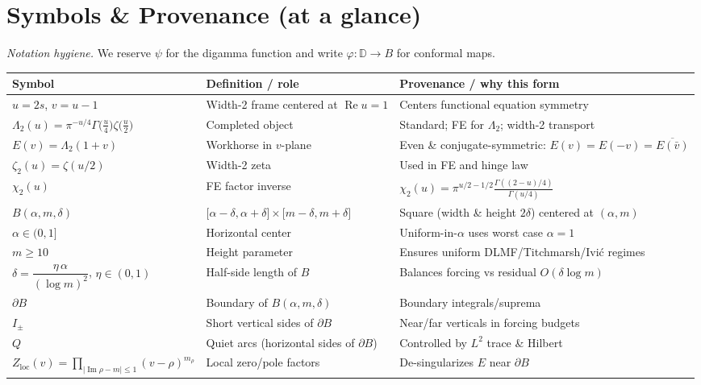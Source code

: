 \documentclass[11pt]{article}
\numberwithin{equation}{section}
\theoremstyle{remark}
\newcommand{\D}{\mathbb{D}}
\DeclareMathOperator{\Imag}{Im}
\DeclareMathOperator{\Real}{Re}
\newcommand{\LamTwo}{\Lambda_2}
\newcommand{\chiTwo}{\chi_2}
\newcommand{\Zloc}{Z_{\mathrm{loc}}}
\begin{document}
\section*{Symbols \& Provenance (at a glance)}

\noindent\textit{Notation hygiene.} We reserve $\psi$ for the digamma function and write $\varphi:\D\to B$ for conformal maps.

\medskip
\begin{tabularx}{\textwidth}{@{}p{3.2cm} L L@{}}
\toprule
\textbf{Symbol} & \textbf{Definition / role} & \textbf{Provenance / why this form}\\
\midrule
$u=2s$, $v=u-1$ & Width-2 frame centered at $\Real u=1$ & Centers functional equation symmetry\\[2pt]
$\LamTwo(u)=\pi^{-u/4}\Gamma\!\Big(\frac{u}{4}\Big)\zeta\!\Big(\frac{u}{2}\Big)$ & Completed object & Standard; FE for $\LamTwo$; width-2 transport\\[2pt]
$E(v)=\LamTwo(1+v)$ & Workhorse in $v$-plane & Even \& conjugate-symmetric: $E(v)=E(-v)=\overline{E(\bar v)}$\\[2pt]
$\zeta_2(u)=\zeta(u/2)$ & Width-2 zeta & Used in FE and hinge law\\[2pt]
$\chiTwo(u)$ & FE factor inverse & $\chiTwo(u)=\pi^{u/2-1/2}\frac{\Gamma((2-u)/4)}{\Gamma(u/4)}$\\[2pt]
$B(\alpha,m,\delta)$ & $\big[\alpha-\delta,\alpha+\delta\big]\times\big[m-\delta,m+\delta\big]$ & Square (width \& height $2\delta$) centered at $(\alpha,m)$\\[2pt]
$\alpha\in(0,1]$ & Horizontal center & Uniform-in-$\alpha$ uses worst case $\alpha=1$\\[2pt]
$m\ge 10$ & Height parameter & Ensures uniform DLMF/Titchmarsh/Ivi\'c regimes\\[2pt]
$\delta=\dfrac{\eta\,\alpha}{(\log m)^2}$, $\eta\in(0,1)$ & Half-side length of $B$ & Balances forcing vs residual $O(\delta\log m)$\\[4pt]
$\partial B$ & Boundary of $B(\alpha,m,\delta)$ & Boundary integrals/suprema\\[2pt]
$I_\pm$ & Short vertical sides of $\partial B$ & Near/far verticals in forcing budgets\\[2pt]
$Q$ & Quiet arcs (horizontal sides of $\partial B$) & Controlled by $L^2$ trace \& Hilbert\\[2pt]
$\Zloc(v)=\prod_{|\Imag\rho-m|\le 1}(v-\rho)^{m_\rho}$ & Local zero/pole factors & De-singularizes $E$ near $\partial B$\\[2pt]

\end{tabularx}
\end{document}
